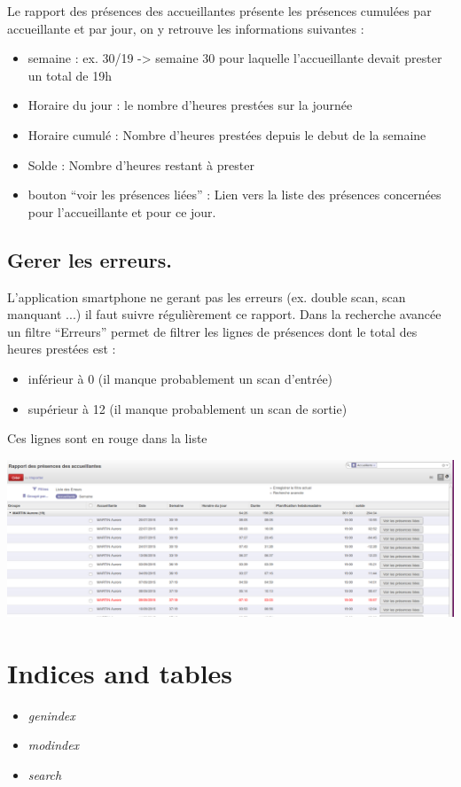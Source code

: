 \documentclass[letterpaper,10pt,english]{sphinxmanual}
\begin{document}
Le rapport des présences des accueillantes présente les présences cumulées par accueillante et par jour, on y retrouve les informations suivantes :
\begin{itemize}
\item {} 
semaine : ex. 30/19 -\textgreater{} semaine 30 pour laquelle l'accueillante devait prester un total de 19h

\item {} 
Horaire du jour : le nombre d'heures prestées sur la journée

\item {} 
Horaire cumulé : Nombre d'heures prestées depuis le debut de la semaine

\item {} 
Solde : Nombre d'heures restant à prester

\item {} 
bouton ``voir les présences liées'' : Lien vers la liste des présences concernées pour l'accueillante et pour ce jour.

\end{itemize}


\section{Gerer les erreurs.}
\label{accueillantes:gerer-les-erreurs}
L'application smartphone ne gerant pas les erreurs (ex. double scan, scan manquant ...) il faut suivre régulièrement ce rapport.
Dans la recherche avancée un filtre ``Erreurs'' permet de filtrer les lignes de présences dont le total des heures prestées est :
\begin{itemize}
\item {} 
inférieur à 0 (il manque probablement un scan d'entrée)

\item {} 
supérieur à 12 (il manque probablement un scan de sortie)

\end{itemize}

Ces lignes sont en rouge dans la liste

\includegraphics{accueillante_rapport_des_presences_erreur.png}


\chapter{Indices and tables}
\label{index:indices-and-tables}\begin{itemize}
\item {} 
\emph{genindex}

\item {} 
\emph{modindex}

\item {} 
\emph{search}

\end{itemize}



\renewcommand{\indexname}{Index}
\printindex
\end{document}
